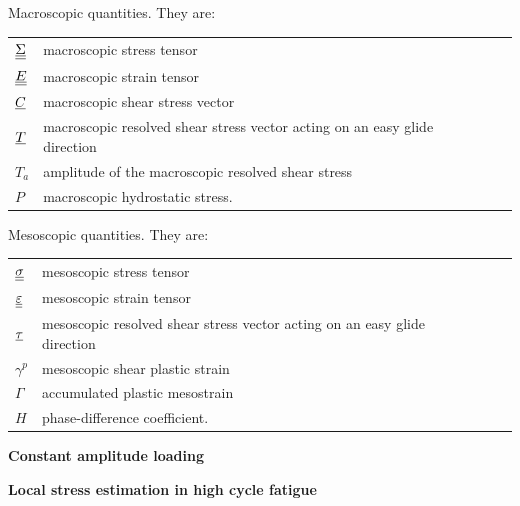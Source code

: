 \begin{flushleft}
	Macroscopic quantities. They are:
	\begin{table}[!h]
		\begin{tabular}{lllll}
			$\uline{\uline{\Sigma}}$ & macroscopic stress tensor &  &  &  \\
			$\uline{\uline{E}}$ & macroscopic strain tensor &  &  &  \\
			${\uline{C}}$ & macroscopic shear stress vector  &  &  &  \\
			${\uline{T}}$ & macroscopic resolved shear stress vector acting on an easy glide direction&  &  &  \\
			$T_a$ & amplitude of the macroscopic resolved shear stress  &  &  &  \\	
			$P$ & macroscopic hydrostatic stress.&  &  &  \\	
		\end{tabular}
	\end{table}
	
	Mesoscopic quantities. They are:
	\begin{table}[!h]
		\begin{tabular}{lllll}
			$\uline{\uline{\sigma}}$& mesoscopic stress tensor &  &  &  \\
			$\uline{\uline{\varepsilon}}$ & mesoscopic strain tensor &  &  &  \\
			$\uline{\tau}$& mesoscopic resolved shear stress vector acting on an easy glide direction &  &  &  \\
			$\gamma^p$& mesoscopic shear plastic strain &  &  &  \\
			$\Gamma$ & accumulated plastic mesostrain &  &  &  \\
			$H$ & phase-difference coefficient.&  &  &  \\
		\end{tabular}
	\end{table}
\end{flushleft}

\newpage
\textbf{Constant amplitude loading}
\vspace{6pt}

\textbf{Local stress estimation in high cycle fatigue}

